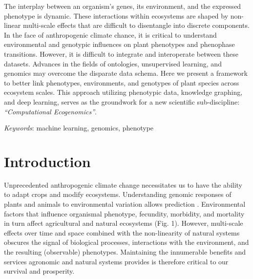 \documentclass[11pt,]{article}
\renewenvironment{abstract}
 {{%
    \setlength{\leftmargin}{0mm}
    \setlength{\rightmargin}{\leftmargin}%
  }%
  \relax}
 {\endlist}
\begin{document}
\begin{abstract}

    \hbox{\vrule height .2pt width 39.14pc}

    \vskip 8.5pt %

\noindent The interplay between an organism's genes, its environment, and the
expressed phenotype is dynamic. These interactions within ecosystems are
shaped by non-linear multi-scale effects that are difficult to
disentangle into discrete components. In the face of anthropogenic
climate chance, it is critical to understand environmental and genotypic
influences on plant phenotypes and phenophase transitions. However, it
is difficult to integrate and interoperate between these datasets.
Advances in the fields of ontologies, unsupervised learning, and
genomics may overcome the disparate data schema. Here we present a
framework to better link phenotypes, environments, and genotypes of
plant species across ecosystem scales. This approach utilizing
phenotypic data, knowledge graphing, and deep learning, serves as the
groundwork for a new scientific sub-discipline: \emph{``Computational
Ecogenomics''}.


\vskip 8.5pt \noindent \emph{Keywords}: machine learning, genomics, phenotype \par

    \hbox{\vrule height .2pt width 39.14pc}



\end{abstract}


\vskip -8.5pt



\noindent \doublespacing

\hypertarget{introduction}{%
\section{Introduction}\label{introduction}}

Unprecedented anthropogenic climate change necessitates us to have the
ability to adapt crops and modify ecosystems. Understanding genomic
responses of plants and animals to environmental variation allows
prediction \citep{ungerer2008ecological, des2013genotype}. Environmental
factors that influence organismal phenotype, fecundity, morbidity, and
mortality in turn affect agricultural and natural ecosystems (Fig. 1).
However, multi-scale effects over time and space combined with the
non-linearity of natural systems
\citep{lorenz1963deterministic, ruel1999jensen, west2009general}
obscures the signal of biological processes, interactions with the
environment, and the resulting (observable) phenotypes. Maintaining the
innumerable benefits and services agronomic and natural systems provides
is therefore critical to our survival and prosperity.
\end{document}
